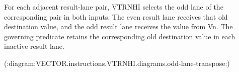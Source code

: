 For each adjacent result-lane pair, VTRNHI selects the odd lane of the
corresponding pair in both inputs.  The even result lane receives that old
destination value, and the odd result lane receives the value from Vn.  The
governing predicate retains the corresponding old destination value in each
inactive result lane.

(:diagram:VECTOR.instructions.VTRNHI.diagrams.odd-lane-transpose:)
